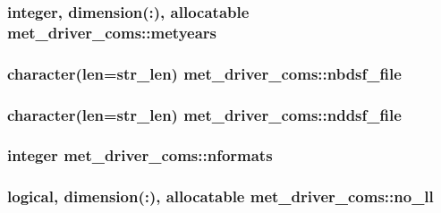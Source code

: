 \subsubsection[{\texorpdfstring{metyears}{metyears}}]{\setlength{\rightskip}{0pt plus 5cm}integer, dimension(\+:), allocatable met\+\_\+driver\+\_\+coms\+::metyears}\hypertarget{namespacemet__driver__coms_af128086aff438c098cbb171df11b5b50}{}\label{namespacemet__driver__coms_af128086aff438c098cbb171df11b5b50}
\subsubsection[{\texorpdfstring{nbdsf\+\_\+file}{nbdsf_file}}]{\setlength{\rightskip}{0pt plus 5cm}character(len=str\+\_\+len) met\+\_\+driver\+\_\+coms\+::nbdsf\+\_\+file}\hypertarget{namespacemet__driver__coms_a8f3d2674e75157c654a61aa253ba5ac7}{}\label{namespacemet__driver__coms_a8f3d2674e75157c654a61aa253ba5ac7}
\subsubsection[{\texorpdfstring{nddsf\+\_\+file}{nddsf_file}}]{\setlength{\rightskip}{0pt plus 5cm}character(len=str\+\_\+len) met\+\_\+driver\+\_\+coms\+::nddsf\+\_\+file}\hypertarget{namespacemet__driver__coms_a8adb3cddd748a6ba29fb75dd69ca54c7}{}\label{namespacemet__driver__coms_a8adb3cddd748a6ba29fb75dd69ca54c7}
\subsubsection[{\texorpdfstring{nformats}{nformats}}]{\setlength{\rightskip}{0pt plus 5cm}integer met\+\_\+driver\+\_\+coms\+::nformats}\hypertarget{namespacemet__driver__coms_abe5693ed3bf2168167db941bc9f61eb2}{}\label{namespacemet__driver__coms_abe5693ed3bf2168167db941bc9f61eb2}
\subsubsection[{\texorpdfstring{no\+\_\+ll}{no_ll}}]{\setlength{\rightskip}{0pt plus 5cm}logical, dimension(\+:), allocatable met\+\_\+driver\+\_\+coms\+::no\+\_\+ll}\hypertarget{namespacemet__driver__coms_a593e5e00920bf69cc5606914b9af1441}{}\label{namespacemet__driver__coms_a593e5e00920bf69cc5606914b9af1441}
